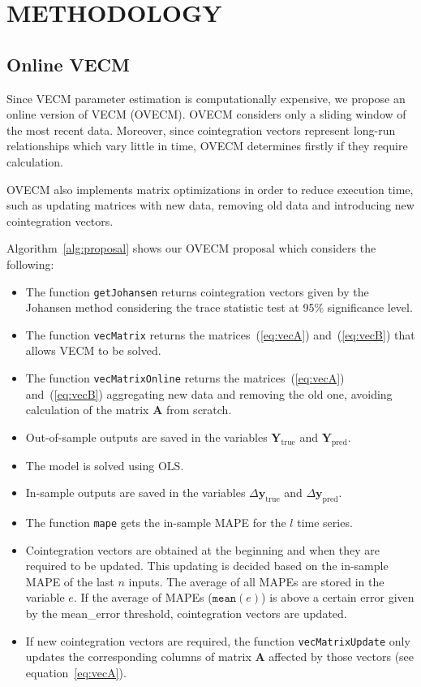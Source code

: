 \section{\uppercase{Methodology}}
\label{sec:methodology}
\noindent 
\subsection{Online VECM} \label{sec:proposal}

Since VECM parameter estimation is computationally expensive, we propose an
online version of VECM (OVECM).  OVECM considers only a sliding window of the
most recent data. Moreover, since cointegration vectors represent long-run
relationships which vary little in time, OVECM determines firstly if they require calculation. 

OVECM also implements matrix optimizations in order to reduce execution time,
such as updating matrices with new data, removing old data and introducing new
cointegration vectors.

Algorithm~\ref{alg:proposal} shows our OVECM proposal which considers the
following:

\begin{itemize}
\item The function \texttt{getJohansen} returns cointegration vectors given by
the Johansen method considering the trace statistic test at 95\%
significance level.
\item The function \texttt{vecMatrix} returns the matrices~(\ref{eq:vecA})
and~(\ref{eq:vecB}) that allows VECM to be solved.
\item The function \texttt{vecMatrixOnline} returns the
matrices~(\ref{eq:vecA}) and~(\ref{eq:vecB}) aggregating new data and removing
the old one, avoiding calculation of the matrix $\mathbf{A}$ from scratch.
\item Out-of-sample outputs are saved in the variables 
$\mathbf{Y}_{\text{true}}$ and $\mathbf{Y}_{\text{pred}}$.
\item The model is solved using OLS.
\item In-sample outputs are saved in the variables $\Delta
\mathbf{y}_{\text{true}}$ and $\Delta \mathbf{y}_{\text{pred}}$.
\item The function \texttt{mape} gets the in-sample MAPE for the $l$ time
series.
\item Cointegration vectors are obtained at the beginning and when they are required to be updated. This updating is decided based on the in-sample MAPE of the last $n$ inputs. The average of all
MAPEs are stored in the variable $e$. If the average of MAPEs
($\texttt{mean}(e)$) is above a certain error given by the mean\_error threshold, cointegration vectors are updated.
\item If new cointegration vectors are required, the function
\texttt{vecMatrixUpdate} only updates the corresponding columns of matrix
$\mathbf{A}$ affected by those vectors (see equation~\ref{eq:vecA}).
\end{itemize}

